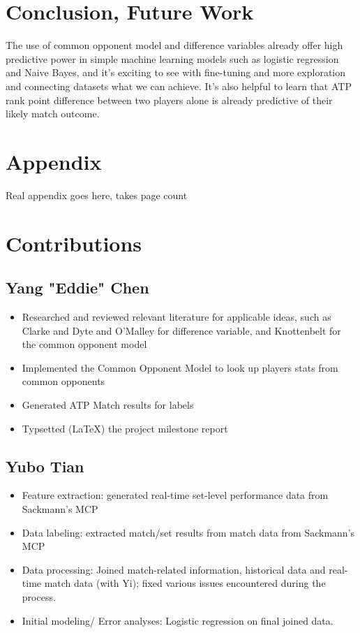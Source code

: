 \documentclass[paper=a4, fontsize=11pt]{scrartcl} %
\numberwithin{equation}{section} %
\numberwithin{figure}{section} %
\numberwithin{table}{section} %
\begin{document}
\section{Conclusion, Future Work}
The use of common opponent model and difference variables already offer high predictive power in simple machine learning models such as logistic regression and Naive Bayes, and it's exciting to see with fine-tuning and more exploration and connecting datasets what we can achieve. It's also helpful to learn that ATP rank point difference between two players alone is already predictive of their likely match outcome. 

\section{Appendix}
Real appendix goes here, takes page count

\section{Contributions}
\subsection{Yang "Eddie" Chen}
\begin{itemize}
\item Researched and reviewed relevant literature for applicable ideas, such as Clarke and Dyte \cite{Clarke2010} and O'Malley \cite{omalley} for difference variable, and Knottenbelt \cite{KNOTTENBELT20123820} for the common opponent model
\item Implemented the Common Opponent Model to look up players stats from common opponents
\item Generated ATP Match results for labels
\item Typsetted (\LaTeX) the project milestone report
\end{itemize}

\subsection{Yubo Tian}
\begin{itemize}
\item Feature extraction:  generated real-time set-level performance data from Sackmann's MCP
\cite{tennis_charting}
\item Data labeling: extracted match/set results from match data from Sackmann's MCP 
\cite{tennis_charting}
\item Data processing: Joined match-related information, historical data and real-time match data (with Yi); fixed various issues encountered during the process.
\item Initial modeling/ Error analyses: Logistic regression on final joined data.
\end{itemize}
\end{document}
